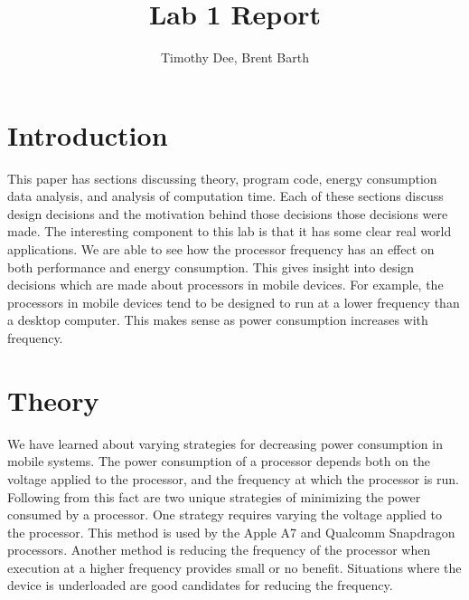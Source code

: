 \documentclass{article} %
\author{Timothy Dee, Brent Barth}
\title{Lab 1 Report}
\begin{document}
\twocolumn
\thispagestyle{empty}   %
\maketitle      %



\section{Introduction}
This paper has sections discussing theory, program code, energy consumption data analysis, and analysis of computation time. Each of these sections discuss design decisions and the motivation behind those decisions those decisions were made.
The interesting component to this lab is that it has some clear real world applications. We are able to see how the processor frequency has an effect on both performance and energy consumption. 
This gives insight into design decisions which are made about processors in mobile devices. For example, the processors in mobile devices tend to be designed to run at a lower frequency than a desktop computer. This makes sense as power consumption increases with frequency. 

\section{Theory}
We have learned about varying strategies for decreasing power consumption in mobile systems. 
The power consumption of a processor depends both on the voltage applied to the processor, and the frequency at which the processor is run. Following from this fact are two unique strategies of minimizing the power consumed by a processor. One strategy requires varying the voltage applied to the processor. This method is used by the Apple A7 and Qualcomm Snapdragon processors. 
Another method is reducing the frequency of the processor when execution at a higher frequency provides small or no benefit. Situations where the device is underloaded are good candidates for reducing the frequency.
\end{document}

